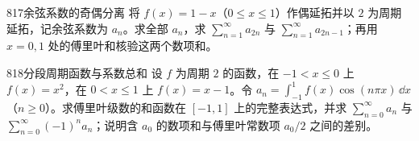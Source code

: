 \begin{exercise}{817}{余弦系数的奇偶分离}
将 $f(x)=1-x$（$0\le x\le1$）作偶延拓并以 $2$ 为周期延拓，记余弦系数为 $a_n$。求全部 $a_n$，求 $\sum_{n=1}^{\infty}a_{2n}$ 与 $\sum_{n=1}^{\infty}a_{2n-1}$；再用 $x=0,1$ 处的傅里叶和核验这两个数项和。
\end{exercise}
\begin{exercise}{818}{分段周期函数与系数总和}
设 $f$ 为周期 $2$ 的函数，在 $-1<x\le0$ 上 $f(x)=x^2$，在 $0<x\le1$ 上 $f(x)=x-1$。令 $a_n=\int_{-1}^{1}f(x)\cos(n\pi x)\,\dd x$（$n\ge0$）。求傅里叶级数的和函数在 $[-1,1]$ 上的完整表达式，并求 $\sum_{n=0}^{\infty}a_n$ 与 $\sum_{n=0}^{\infty}(-1)^na_n$；说明含 $a_0$ 的数项和与傅里叶常数项 $a_0/2$ 之间的差别。
\end{exercise}
